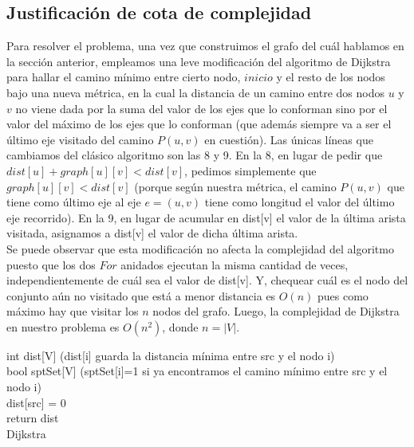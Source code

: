 \documentclass[11pt, a4paper, twoside]{article}
\begin{document}
\subsection{Justificación de cota de complejidad}
Para resolver el problema, una vez que construimos el grafo del cuál hablamos en la sección anterior,
empleamos una leve modificación del algoritmo de Dijkstra para hallar el camino mínimo entre cierto
nodo, $inicio$ y el resto de los nodos bajo una nueva métrica, en la cual la distancia de un camino
entre dos nodos $u$ y $v$ no viene dada por la suma del valor de los ejes que lo conforman sino por
el valor del máximo de los ejes que lo conforman (que además siempre va a ser el último eje visitado
del camino $P(u,v)$ en cuestión). Las únicas líneas que cambiamos del clásico algoritmo
son las 8 y 9. En la 8, en lugar de pedir que $dist[u] + graph[u][v] < dist[v]$, pedimos simplemente
que $graph[u][v] < dist[v]$ (porque según nuestra métrica, el camino $P(u,v)$ que tiene como último eje
al eje $e=(u,v)$ tiene como longitud el valor del último eje recorrido).
En la 9, en lugar de acumular en dist[v] el valor de la última arista visitada, asignamos
a dist[v] el valor de dicha última arista. \\
Se puede observar que esta modificación no afecta la complejidad del algoritmo puesto que los dos $For$
anidados ejecutan la misma cantidad de veces, independientemente de cuál sea el valor de dist[v]. Y, 
chequear cuál es el nodo del conjunto aún no visitado que está a menor distancia es $O(n)$ pues como
máximo hay que visitar los $n$ nodos del grafo.
Luego, la complejidad de Dijkstra en nuestro problema es $O(n^2)$, donde $n = |V|$.

\begin{algorithm}[H]
           int dist[V] (dist[i] guarda la distancia mínima entre src y el nodo i)\\
           bool sptSet[V] (sptSet[i]=1 si ya encontramos el camino mínimo entre src y el nodo i) \\
           dist[src] = 0 \\
   return dist \\
\caption{Dijkstra}
\end{algorithm}
\end{document}
